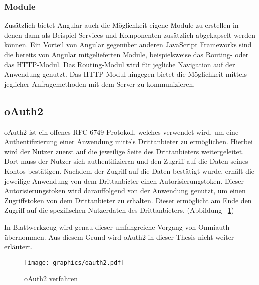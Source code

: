 \subsubsection{Module}
\label{sec: ang-modul}
Zusätzlich bietet Angular auch die Möglichkeit eigene Module zu erstellen in denen dann als Beispiel Services und Komponenten zusätzlich abgekapselt werden können. Ein Vorteil von Angular gegenüber anderen JavaScript Frameworks sind die bereits von Angular mitgelieferten Module, beispielsweise das Routing- oder das HTTP-Modul. Das Routing-Modul wird für jegliche Navigation auf der Anwendung genutzt. Das \gls{HTTP}-Modul hingegen bietet die Möglichkeit mittels jeglicher Anfragemethoden mit dem Server zu kommunizieren.

\subsection{oAuth2}
\label{sec: oauth2}
\gls{oAuth2} ist ein offenes \gls{RFC} 6749 Protokoll, welches verwendet wird, um eine Authentifizierung einer Anwendung mittels Drittanbieter zu ermöglichen. Hierbei wird der Nutzer zuerst auf die jeweilige Seite des Drittanbieters weitergeleitet. Dort muss der Nutzer sich authentifizieren und den Zugriff auf die Daten seines Kontos bestätigen. Nachdem der Zugriff auf die Daten bestätigt wurde, erhält die jeweilige Anwendung von dem Drittanbieter einen Autorisierungstoken. Dieser Autorisierungstoken wird darauffolgend von der Anwendung genutzt, um einen Zugriffstoken von dem Drittanbieter zu erhalten. Dieser ermöglicht am Ende den Zugriff auf die spezifischen Nutzerdaten des Drittanbieters. (Abbildung ~\ref{fig:oauth2})

In Blattwerkzeug wird genau dieser umfangreiche Vorgang von Omniauth übernommen. Aus diesem Grund wird oAuth2 in dieser Thesis nicht weiter erläutert.

\begin{figure}
	\centering
	\texttt{[image: graphics/oauth2.pdf]}
	\caption{oAuth2 verfahren}
	\label{fig:oauth2}
\end{figure}

